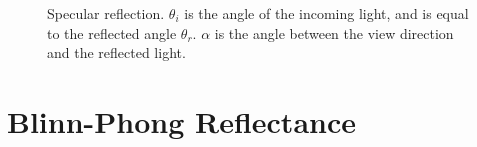 \begin{figure}[H]
	\begin{center}
	\end{center}
	\caption{Specular reflection. $\theta_i$ is the angle of the incoming light, and is equal to the reflected angle $\theta_r$. $\alpha$ is the angle between the view direction and the reflected light.}
	\label{fig:SPECULAR1}
\end{figure}

	\section{Blinn-Phong Reflectance}\label{BlinnPhong}


